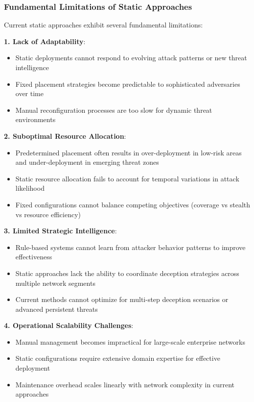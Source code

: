 \documentclass[12pt,oneside,a4paper]{article}
\theoremstyle{definition}
\theoremstyle{plain}
\begin{document}
\subsubsection{Fundamental Limitations of Static Approaches}

Current static approaches exhibit several fundamental limitations:

\textbf{1. Lack of Adaptability}:
\begin{itemize}
\item Static deployments cannot respond to evolving attack patterns or new threat intelligence
\item Fixed placement strategies become predictable to sophisticated adversaries over time
\item Manual reconfiguration processes are too slow for dynamic threat environments
\end{itemize}

\textbf{2. Suboptimal Resource Allocation}:
\begin{itemize}
\item Predetermined placement often results in over-deployment in low-risk areas and under-deployment in emerging threat zones
\item Static resource allocation fails to account for temporal variations in attack likelihood
\item Fixed configurations cannot balance competing objectives (coverage vs stealth vs resource efficiency)
\end{itemize}

\textbf{3. Limited Strategic Intelligence}:
\begin{itemize}
\item Rule-based systems cannot learn from attacker behavior patterns to improve effectiveness
\item Static approaches lack the ability to coordinate deception strategies across multiple network segments
\item Current methods cannot optimize for multi-step deception scenarios or advanced persistent threats
\end{itemize}

\textbf{4. Operational Scalability Challenges}:
\begin{itemize}
\item Manual management becomes impractical for large-scale enterprise networks
\item Static configurations require extensive domain expertise for effective deployment
\item Maintenance overhead scales linearly with network complexity in current approaches
\end{itemize}
\end{document}
